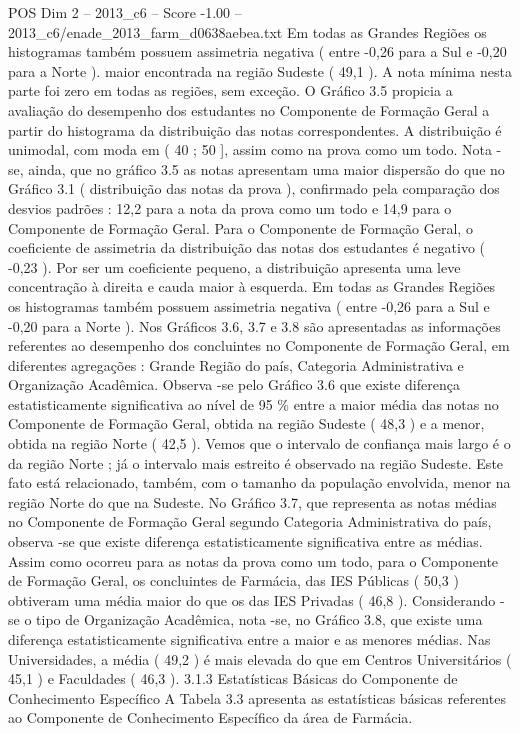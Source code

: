 \begin{textsample}{POS Dim 2 – 2013\_c6 – Score -1.00 – 2013\_c6/enade\_2013\_farm\_d0638aebea.txt}
Em todas as Grandes Regiões os histogramas também possuem assimetria negativa ( entre -0,26 para a Sul e -0,20 para a Norte ). maior encontrada na região Sudeste ( 49,1 ).
A nota mínima nesta parte foi zero em todas as regiões, sem exceção.
O Gráfico 3.5 propicia a avaliação do desempenho dos estudantes no Componente de Formação Geral a partir do histograma da distribuição das notas correspondentes.
A distribuição é unimodal, com moda em ( 40 ; 50 ], assim como na prova como um todo.
Nota -se, ainda, que no gráfico 3.5 as notas apresentam uma maior dispersão do que no Gráfico 3.1 ( distribuição das notas da prova ), confirmado pela comparação dos desvios padrões : 12,2 para a nota da prova como um todo e 14,9 para o Componente de Formação Geral.
Para o Componente de Formação Geral, o coeficiente de assimetria da distribuição das notas dos estudantes é negativo ( -0,23 ).
Por ser um coeficiente pequeno, a distribuição apresenta uma leve concentração à direita e cauda maior à esquerda.
Em todas as Grandes Regiões os histogramas também possuem assimetria negativa ( entre -0,26 para a Sul e -0,20 para a Norte ).
Nos Gráficos 3.6, 3.7 e 3.8 são apresentadas as informações referentes ao desempenho dos concluintes no Componente de Formação Geral, em diferentes agregações : Grande Região do país, Categoria Administrativa e Organização Acadêmica.
Observa -se pelo Gráfico 3.6 que existe diferença estatisticamente significativa ao nível de 95 \% entre a maior média das notas no Componente de Formação Geral, obtida na região Sudeste ( 48,3 ) e a menor, obtida na região Norte ( 42,5 ).
Vemos que o intervalo de confiança mais largo é o da região Norte ; já o intervalo mais estreito é observado na região Sudeste.
Este fato está relacionado, também, com o tamanho da população envolvida, menor na região Norte do que na Sudeste.
No Gráfico 3.7, que representa as notas médias no Componente de Formação Geral segundo Categoria Administrativa do país, observa -se que existe diferença estatisticamente significativa entre as médias.
Assim como ocorreu para as notas da prova como um todo, para o Componente de Formação Geral, os concluintes de Farmácia, das IES Públicas ( 50,3 ) obtiveram uma média maior do que os das IES Privadas ( 46,8 ).
Considerando -se o tipo de Organização Acadêmica, nota -se, no Gráfico 3.8, que existe uma diferença estatisticamente significativa entre a maior e as menores médias.
Nas Universidades, a média ( 49,2 ) é mais elevada do que em Centros Universitários ( 45,1 ) e Faculdades ( 46,3 ). 3.1.3 Estatísticas Básicas do Componente de Conhecimento Específico A Tabela 3.3 apresenta as estatísticas básicas referentes ao Componente de Conhecimento Específico da área de Farmácia.

\end{textsample}
